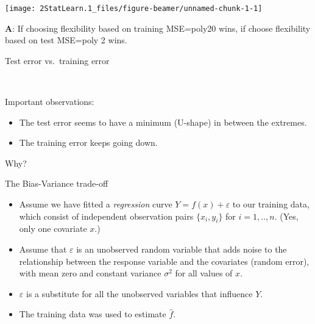 \documentclass[ignorenonframetext,]{beamer}
\begin{document}
\begin{frame}

\begin{center}\texttt{[image: 2StatLearn.1\_files/figure-beamer/unnamed-chunk-1-1]} \end{center}

\textbf{A}: If choosing flexibility based on training MSE=poly20 wins,
if choose flexibility based on test MSE=poly 2 wins.

\end{frame}

\begin{frame}

\begin{block}{Test error vs.~training error}

\(~\)

Important observations:

\begin{itemize}
\item
  The test error seems to have a minimum (U-shape) in between the
  extremes.
\item
  The training error keeps going down.
\end{itemize}

\vspace{1.5cm} \centering
Why?

\end{block}

\end{frame}

\begin{frame}{The Bias-Variance trade-off}

\begin{itemize}
\item
  Assume we have fitted a \emph{regression} curve
  \(Y = f(x) + \varepsilon\) to our training data, which consist of
  independent observation pairs \(\{x_i, y_i\}\) for \(i=1,..,n\). (Yes,
  only one covariate \(x\).)
\item
  Assume that \(\varepsilon\) is an unobserved random variable that adds
  noise to the relationship between the response variable and the
  covariates (random error), with mean zero and constant variance
  \(\sigma^2\) for all values of \(x\).
\item
  \(\varepsilon\) is a substitute for all the unobserved variables that
  influence \(Y\).
\item
  The training data was used to estimate \(\hat{f}\).
\end{itemize}

\end{frame}
\end{document}
